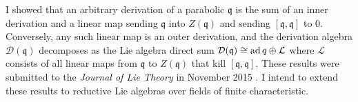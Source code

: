 \documentclass[11pt]{article}
\begin{document}
I showed that an arbitrary derivation of a parabolic $\mathfrak q$ is
the sum of an inner derivation and a linear map sending $\mathfrak q$
into $Z(\mathfrak q)$ and sending $[\mathfrak q, \mathfrak q]$ to $0$.
Conversely, any such linear map is an outer derivation, and the
derivation algebra $\mathcal{D}(\mathfrak{q})$ decomposes as the Lie
algebra direct sum $\mathcal{D}(\mathfrak{q}) \cong \operatorname{ad} q \oplus
\mathcal{L}$ where $\mathcal{L}$ consists of all linear maps from
$\mathfrak{q}$ to $Z(\mathfrak{q})$ that kill
$[\mathfrak{q},\mathfrak{q}]$. These results were submitted to the
\emph{Journal of Lie Theory} in November 2015
\cite{arxiv:brice2015derivations}. I intend to extend these results to
reductive Lie algebras over fields of finite characteristic.

\printbibliography[heading=none]

\label{page:last}
\end{document}
